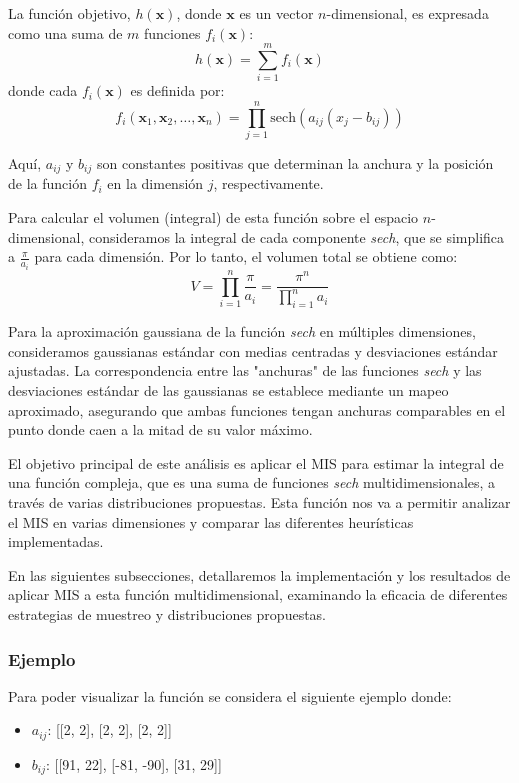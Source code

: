 \documentclass{article}
\begin{document}
La función objetivo, \( h(\mathbf{x}) \), donde \( \mathbf{x} \) es un vector \( n \)-dimensional, es expresada como una suma de \( m \) funciones \( f_i(\mathbf{x}) \):
\[ h(\mathbf{x}) = \sum_{i=1}^{m} f_i(\mathbf{x}) \]
donde cada \( f_i(\mathbf{x}) \) es definida por:
\[ f_i(\mathbf{x}_1, \mathbf{x}_2, \ldots, \mathbf{x}_n) = \prod_{j=1}^{n} \text{sech}(a_{ij} (x_j - b_{ij})) \]

Aquí, \( a_{ij} \) y \( b_{ij} \) son constantes positivas que determinan la anchura y la posición de la función \( f_i \) en la dimensión \( j \), respectivamente.

Para calcular el volumen (integral) de esta función sobre el espacio \( n \)-dimensional, consideramos la integral de cada componente \textit{sech}, que se simplifica a \( \frac{\pi}{a_i} \) para cada dimensión. Por lo tanto, el volumen total se obtiene como:
\[ V = \prod_{i=1}^{n} \frac{\pi}{a_i} = \frac{\pi^n}{\prod_{i=1}^{n} a_i} \]

Para la aproximación gaussiana de la función \textit{sech} en múltiples dimensiones, consideramos gaussianas estándar con medias centradas y desviaciones estándar ajustadas.
La correspondencia entre las "anchuras" de las funciones \textit{sech} y las desviaciones estándar de las gaussianas se establece mediante un mapeo aproximado, asegurando que ambas funciones tengan anchuras comparables en el punto donde caen a la mitad de su valor máximo.

El objetivo principal de este análisis es aplicar el MIS para estimar la integral de una función compleja, que es una suma de funciones \textit{sech} multidimensionales, a través de varias distribuciones propuestas.
Esta función nos va a permitir analizar el MIS en varias dimensiones y comparar las diferentes heurísticas implementadas.

En las siguientes subsecciones, detallaremos la implementación y los resultados de aplicar MIS a esta función multidimensional, examinando la eficacia de diferentes estrategias de muestreo y distribuciones propuestas.

\subsubsection{Ejemplo}

Para poder visualizar la función se considera el siguiente ejemplo donde:

\begin{itemize}
    \item \textbf{\( a_{ij} \)}: [[2, 2], [2, 2], [2, 2]]
    \item \textbf{\( b_{ij} \)}: [[91, 22], [-81, -90], [31, 29]]
\end{itemize}
\end{document}
